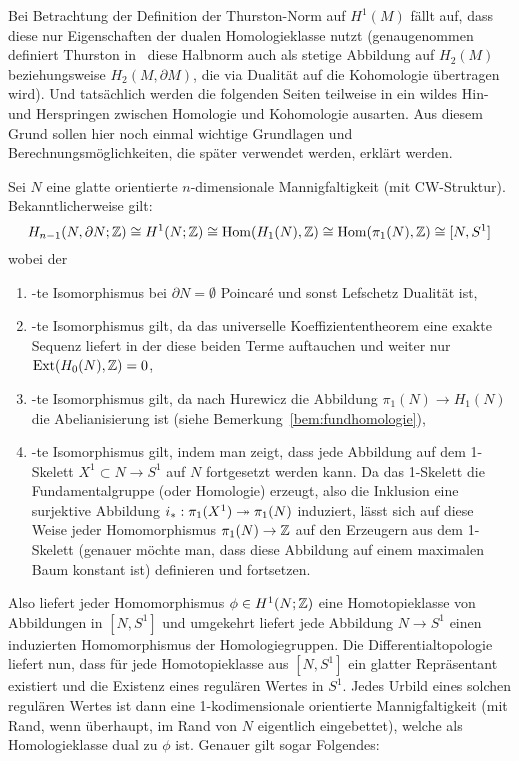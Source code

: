 	Bei Betrachtung der Definition der Thurston-Norm auf $H^1(M)$ fällt auf, dass diese nur Eigenschaften der dualen Homologieklasse nutzt (genaugenommen definiert Thurston in~\cite{Thurston.1986} diese Halbnorm auch als stetige Abbildung auf $H_2(M)$ beziehungsweise $H_2(M,\partial M)$, die via Dualität auf die Kohomologie übertragen wird). Und tatsächlich werden die folgenden Seiten teilweise in ein wildes Hin- und Herspringen zwischen Homologie und Kohomologie ausarten. Aus diesem Grund sollen hier noch einmal wichtige Grundlagen und Berechnungsmöglichkeiten, die später verwendet werden, erklärt werden.
	\begin{bem}
	Sei $N$ eine glatte orientierte $n$-dimensionale Mannigfaltigkeit (mit CW-Struktur).
		Bekanntlicherweise gilt:
		\[
					H_{n-1}(N,\partial N;\mathbb{Z})\cong H^1(N;\mathbb{Z}) \cong \operatorname{Hom}(H_1(N),\mathbb{Z}) \cong \operatorname{Hom}(\pi_1(N),\mathbb{Z}) \cong  [N,S^1]
		\]		
		wobei der
		\begin{enumerate}
			\item -te Isomorphismus bei $\partial N= \emptyset$ Poincaré und sonst Lefschetz Dualität ist,
			\item -te Isomorphismus gilt, da das universelle Koeffiziententheorem eine exakte Sequenz liefert in der diese beiden Terme auftauchen und weiter nur $\operatorname{Ext}(H_0(N),\mathbb{Z}) = 0$,
			\item -te Isomorphismus gilt, da nach Hurewicz die Abbildung $\pi_1(N)\to H_1(N)$ die Abelianisierung ist (siehe Bemerkung~\ref{bem:fundhomologie}),
			\item -te Isomorphismus gilt, indem man zeigt, dass jede Abbildung auf dem 1-Skelett $X^1 \subset N \to S^1$ auf $N$ fortgesetzt werden kann. Da das 1-Skelett die Fundamentalgruppe (oder Homologie) erzeugt, also die Inklusion eine surjektive Abbildung $i_*:\pi_1(X^1)\twoheadrightarrow\pi_1(N)$ induziert, lässt sich auf diese Weise jeder Homomorphismus $\pi_1(N)\to \mathbb{Z}$ auf den Erzeugern aus dem 1-Skelett (genauer möchte man, dass diese Abbildung auf einem maximalen Baum konstant ist) definieren und fortsetzen. 
		\end{enumerate}
	Also liefert jeder Homomorphismus $\phi \in H^1(N;\mathbb{Z})$ eine Homotopieklasse von Abbildungen in $[N,S^1]$ und umgekehrt liefert jede Abbildung $N\to S^1$ einen induzierten Homomorphismus der Homologiegruppen. Die Differentialtopologie liefert nun, dass für jede Homotopieklasse aus $[N,S^1]$ ein glatter Repräsentant existiert und die Existenz eines regulären Wertes in $S^1$. Jedes Urbild eines solchen regulären Wertes ist dann eine 1-kodimensionale orientierte Mannigfaltigkeit (mit Rand, wenn überhaupt, im Rand von $N$ eigentlich eingebettet), welche als Homologieklasse dual zu $\phi$ ist. Genauer gilt sogar Folgendes:
	\end{bem}

